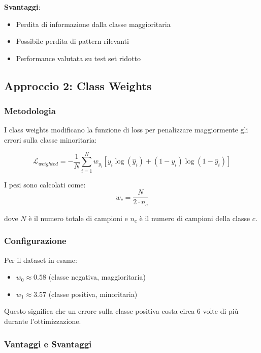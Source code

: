 \textbf{Svantaggi}:
\begin{itemize}
    \item Perdita di informazione dalla classe maggioritaria
    \item Possibile perdita di pattern rilevanti
    \item Performance valutata su test set ridotto
\end{itemize}

\subsection{Approccio 2: Class Weights}

\subsubsection{Metodologia}

I class weights modificano la funzione di loss per penalizzare maggiormente gli errori sulla classe minoritaria:

\begin{equation}
    \mathcal{L}_{weighted} = -\frac{1}{N} \sum_{i=1}^{N} w_{y_i} \left[ y_i \log(\hat{y}_i) + (1 - y_i) \log(1 - \hat{y}_i) \right]
\end{equation}

I pesi sono calcolati come:
\begin{equation}
    w_c = \frac{N}{2 \cdot n_c}
\end{equation}

dove $N$ è il numero totale di campioni e $n_c$ è il numero di campioni della classe $c$.

\subsubsection{Configurazione}

Per il dataset in esame:
\begin{itemize}
    \item $w_0 \approx 0.58$ (classe negativa, maggioritaria)
    \item $w_1 \approx 3.57$ (classe positiva, minoritaria)
\end{itemize}

Questo significa che un errore sulla classe positiva costa circa 6 volte di più durante l'ottimizzazione.

\subsubsection{Vantaggi e Svantaggi}

